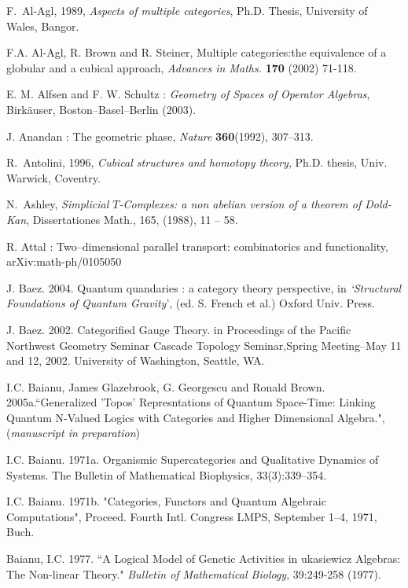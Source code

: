 \documentclass[12pt]{article}
\theoremstyle{definition}
\theoremstyle{remark}
\numberwithin{equation}{subsection}
\begin{document}
\begin{thebibliography}{99}

F.~Al-Agl, 1989, {\em Aspects of multiple categories\/}, Ph.D. Thesis, University of Wales, Bangor.

F.A. Al-Agl, R. Brown and R. Steiner, Multiple categories:the equivalence of a globular and a cubical approach, 
{\em Advances in Maths.} {\bf 170} (2002) 71-118.

E. M. Alfsen and F. W. Schultz : \emph{Geometry of Spaces of Operator Algebras}, Birk\"auser, Boston--Basel--Berlin (2003).

J. Anandan : The geometric phase, \emph{Nature} \textbf{360}(1992), 307--313.

R.~Antolini, 1996, {\em Cubical structures and homotopy theory\/},
Ph.D. thesis, Univ. Warwick, Coventry.

N.~Ashley, {\em Simplicial $T$-Complexes: a non abelian version of a theorem of Dold-Kan},
Dissertationes Math., 165, (1988), 11 -- 58.

R. Attal : Two--dimensional parallel transport: combinatorics and functionality, arXiv:math-ph/0105050

J. Baez. 2004. Quantum quandaries : a category theory perspective, in \emph{`Structural
Foundations of Quantum Gravity}', (ed. S. French et al.) Oxford Univ. Press.

J. Baez. 2002. Categorified Gauge Theory. in Proceedings of the Pacific Northwest Geometry
Seminar Cascade Topology Seminar,Spring Meeting--May 11 and 12, 2002. University of 
Washington, Seattle, WA.

I.C. Baianu, James Glazebrook, G. Georgescu and Ronald Brown. 2005a.``Generalized 'Topos' 
Represntations of Quantum Space-Time: Linking Quantum N-Valued Logics with Categories and 
Higher Dimensional Algebra.", (\emph{manuscript in preparation})

I.C. Baianu. 1971a. Organismic Supercategories and Qualitative Dynamics of Systems. The 
Bulletin of Mathematical Biophysics, 33(3):339--354.

I.C. Baianu. 1971b. "Categories, Functors and Quantum Algebraic Computations", Proceed. Fourth 
Intl. Congress LMPS, September 1--4, 1971, Buch.

Baianu, I.C. 1977. ``A Logical Model of Genetic Activities in \Textsl{\L}ukasiewicz Algebras: 
The Non-linear Theory." \emph{Bulletin of Mathematical Biology}, 39:249-258 (1977).


\end{thebibliography}
\end{document}
